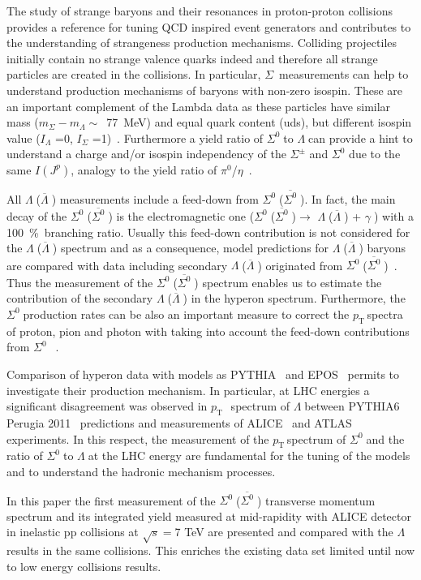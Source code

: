 \documentclass[ALICE,manyauthors]{cernphprep}
\newcommand{\sig}{\ensuremath{\Sigma^0  \; }}
\newcommand{\asig}{\ensuremath{\overline{\Sigma^0} \; }}
\newcommand{\gam}{\ensuremath{\gamma \; }}
\newcommand{\lam}{\ensuremath{\Lambda \; }}
\newcommand{\alam}{\ensuremath{\overline{\Lambda} \; }}
\newcommand{\pt}{\ensuremath{p_{\mathrm{T}\; }}}
\newcommand{\red}{\textcolor{red}}
\begin{document}
The study of strange baryons and their resonances in proton-proton collisions provides a reference for tuning QCD 
inspired event generators and contributes to the understanding of strangeness production mechanisms. Colliding projectiles initially 
contain no strange valence quarks indeed and therefore all strange particles are created in the 
collisions. In particular, $\Sigma$~measurements can help to understand production mechanisms of baryons with non-zero 
isospin. These are an important complement of the Lambda data as these particles have similar mass 
($m_{\Sigma} - m_{\Lambda} \sim$~77~MeV) and equal quark content (uds), but different isospin value 
($I_{\Lambda}$ =0, $I_{\Sigma}$ =1)~\cite{cite:PDG}. Furthermore a yield ratio of \sig to \lam can provide 
a hint to understand a charge and/or isospin independency of the $\Sigma^\pm$ and $\Sigma^0$ due to the same $I(J^p)$, 
analogy to the yield ratio of $\pi^0$/$\eta$\red{~\cite{cite:pi0-2012}}.

All \lam (\alam) measurements include a feed-down from \sig (\asig). In fact, the main decay of the \sig (\asig) is the 
electromagnetic one (\sig (\asig)$\to $ \lam (\alam) + \gam) with a 100~\%~branching ratio. Usually this feed-down contribution 
is not considered for the \lam (\alam) spectrum and as a consequence, model predictions for \lam (\alam) baryons are 
compared with data including secondary \lam (\alam) originated from \sig (\asig)\red{~\cite{cite:lamda_model}}. 
Thus the measurement of the \sig (\asig) spectrum enables us to estimate the contribution of the secondary \lam (\alam) 
in the hyperon spectrum. Furthermore, the \sig production rates can be also an important measure to correct the \pt spectra of
proton, pion and photon with taking into account the feed-down contributions from \sig\red{~\cite{cite:feed-down}}.

Comparison of hyperon data with models as  PYTHIA~\cite{cite:pythia6} and EPOS~\cite{cite:EPOS3} permits 
to investigate their production mechanism. In particular, at LHC energies a significant disagreement was observed in 
\pt~spectrum of \lam between PYTHIA6 Perugia 2011~\cite{cite:pythia6} predictions and measurements of 
ALICE~\cite{cite:DDChin-Lam} and ATLAS~\cite{cite:ATLAS-Lam-pp-2011} experiments. 
In this respect, the measurement of the \pt spectrum of  \sig and the ratio of \sig to \lam at the LHC energy
are fundamental for the tuning of the models and to understand the hadronic mechanism 
processes.

In this paper the first measurement of the \sig (\asig) transverse momentum spectrum and its integrated yield measured 
at mid-rapidity with ALICE detector in inelastic pp collisions at $\sqrt{s} =$7 TeV are presented and compared
with the \lam results in the same collisions. This enriches the existing data set limited until now to low energy collisions results. 
\end{document}
